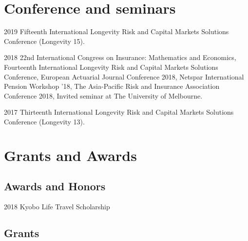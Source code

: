 \documentclass[12pt,letterpaper]{report}
\begin{document}
    \section*{Conference and seminars}


    \begin{tablist}
		\item[2019] \tab Fifteenth International Longevity Risk and Capital Markets Solutions Conference (Longevity 15).
		
        \item[2018] \tab 22nd International Congress on Insurance: Mathematics and Economics, Fourteenth International Longevity Risk and Capital Markets Solutions Conference, European Actuarial Journal Conference 2018, Netspar International Pension Workshop ’18, The Asia-Pacific Risk and Insurance Association Conference 2018, Invited seminar at The University of Melbourne.
        
        \item[2017] \tab Thirteenth International Longevity Risk and Capital Markets Solutions Conference (Longevity 13).
  

    \end{tablist}



    \section*{Grants and Awards}

    \subsection*{Awards and Honors}

    \begin{tablist}

        \item[2018] \tab Kyobo Life Travel Scholarship 



    \end{tablist}

    \subsection*{Grants}
\end{document}
